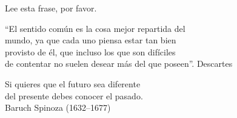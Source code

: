 \begin{exampletwoup}
\centerline{Lee esta frase, por favor.}

\begin{center}
``El sentido común es la cosa mejor repartida del \\
mundo, ya que cada uno piensa estar tan bien \\
provisto de él, que incluso los que son difíciles \\
de contentar no suelen desear más del que poseen''.
Descartes
\end{center}

\begin{flushright}
Si quieres que el futuro sea diferente\\
del presente debes conocer el pasado.\\
Baruch Spinoza (1632--1677)
\end{flushright}
\end{exampletwoup}
